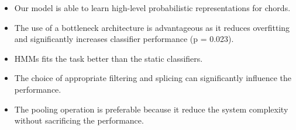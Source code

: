 \documentclass[landscape,archE1,fontscale=0.315]{baposter} %
\newcommand{\compresslist}{ %
\setlength{\itemsep}{1pt}
\setlength{\parskip}{0pt}
\setlength{\parsep}{0pt}
}
\begin{document}
\begin{poster}
{%


\begin{multicols}{2}
\begin{itemize}\compresslist
\item Our
model is able to learn high-level probabilistic representations
for chords.
\item The use of a bottleneck architecture is advantageous
as it reduces overfitting and significantly increases classifier performance (p = 0.023).
\item HMMs fits the task better than the static classifiers. 
\item The choice of appropriate filtering and
splicing can significantly influence the performance.
\item The pooling operation is preferable because it reduce the system complexity without sacrificing the performance. 
\end{itemize}
\end{multicols}
%
}





\end{poster}
\end{document}
